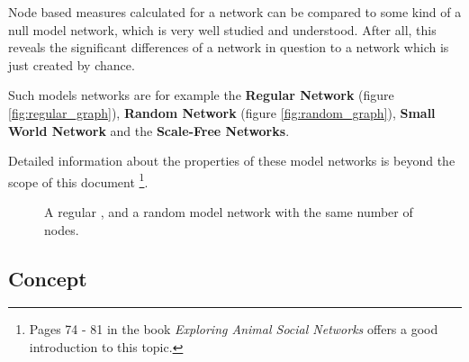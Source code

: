 Node based measures calculated for a network can be compared to some kind of a null model network, which is very well studied and understood. After all, this reveals the significant differences of a network in question to a network which is just created by chance.

Such models networks are for example the \textbf{Regular Network} (figure \ref{fig:regular_graph}), \textbf{Random Network} (figure \ref{fig:random_graph}), \textbf{Small World Network} and the \textbf{Scale-Free Networks}.

Detailed information about the properties of these model networks is beyond the scope of this document \footnote{Pages 74 - 81 in the book \textit{Exploring Animal Social Networks}\cite{croft:07} offers a good introduction to this topic.}.

\begin{figure}[htpb]%
	\centering 
	\qquad 
	\caption[A regular and a random model network]{A regular , and a random  model network with the same number of nodes.} 
	 
\end{figure} 

\subsection{Concept}
\label{subsec:graph_concept}

